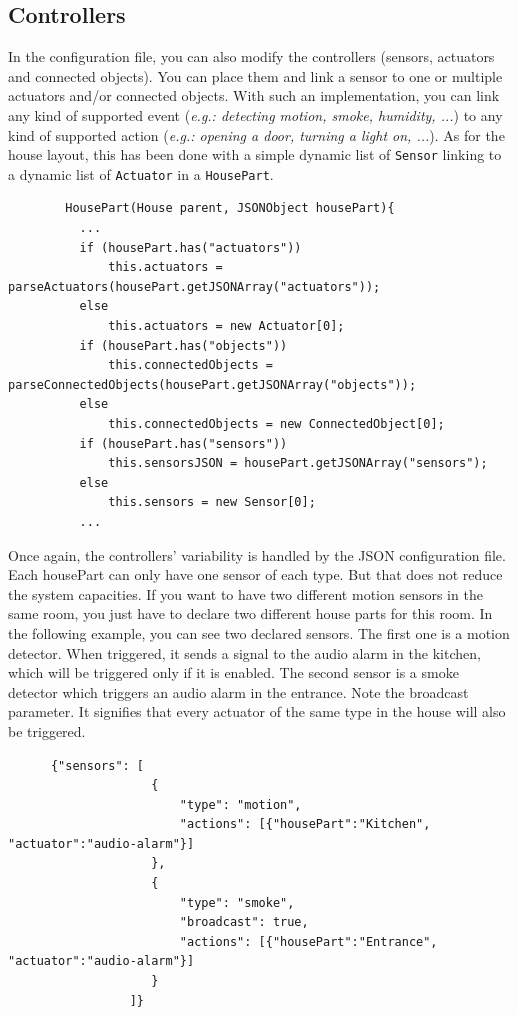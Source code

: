     \subsection{Controllers}
      In the configuration file, you can also modify the controllers (sensors, actuators and connected objects). You can place them and link a sensor to one or multiple actuators and/or connected objects. With such an implementation, you can link any kind of supported event (\emph{e.g.: detecting motion, smoke, humidity, ...}) to any kind of supported action (\emph{e.g.: opening a door, turning a light on, ...}). As for the house layout, this has been done with a simple dynamic list of \texttt{Sensor} linking to a dynamic list of \texttt{Actuator} in a \texttt{HousePart}.
      \begin{verbatim}
        HousePart(House parent, JSONObject housePart){
          ...
          if (housePart.has("actuators"))
              this.actuators = parseActuators(housePart.getJSONArray("actuators"));
          else
              this.actuators = new Actuator[0];
          if (housePart.has("objects"))
              this.connectedObjects = parseConnectedObjects(housePart.getJSONArray("objects"));
          else
              this.connectedObjects = new ConnectedObject[0];
          if (housePart.has("sensors"))
              this.sensorsJSON = housePart.getJSONArray("sensors");
          else
              this.sensors = new Sensor[0];
          ...
      \end{verbatim}

      Once again, the controllers' variability is handled by the JSON configuration file. Each housePart can only have one sensor of each type. But that does not reduce the system capacities. If you want to have two different motion sensors in the same room, you just have to declare two different house parts for this room. In the following example, you can see two declared sensors.
      The first one is a motion detector. When triggered, it sends a signal to the audio alarm in the kitchen, which will be triggered only if it is enabled.
      The second sensor is a smoke detector which triggers an audio alarm in the entrance. Note the broadcast parameter. It signifies that every actuator of the same type in the house will also be triggered.
      \begin{verbatim}
      {"sensors": [
                    {
                        "type": "motion",
                        "actions": [{"housePart":"Kitchen", "actuator":"audio-alarm"}]
                    },
                    {
                        "type": "smoke",
                        "broadcast": true,
                        "actions": [{"housePart":"Entrance", "actuator":"audio-alarm"}]
                    }
                 ]}
      \end{verbatim}

